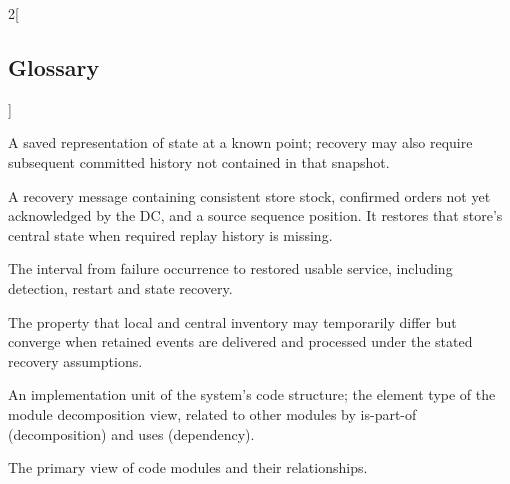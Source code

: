 \begin{multicols}{2}[\subsection{Glossary}\label{sec:glossary}]
\begin{description}[style=unboxed,leftmargin=1em,labelindent=0pt,itemsep=0.5pt,parsep=0pt]
\item[Snapshot] A saved representation of state at a known point; recovery may also require subsequent committed history not contained in that snapshot.
\item[Store Snapshot] A recovery message containing consistent store stock, confirmed orders not yet acknowledged by the DC, and a source sequence position. It restores that store's central state when required replay history is missing.
\item[Recovery time] The interval from failure occurrence to restored usable service, including detection, restart and state recovery.
\item[Eventual consistency] The property that local and central inventory may temporarily differ but converge when retained events are delivered and processed under the stated recovery assumptions.
\item[Module] An implementation unit of the system's code structure; the element type of the module decomposition view, related to other modules by is-part-of (decomposition) and uses (dependency).
\item[Module decomposition view] The primary view of code modules and their relationships.
\end{description}
\end{multicols}
\endgroup
